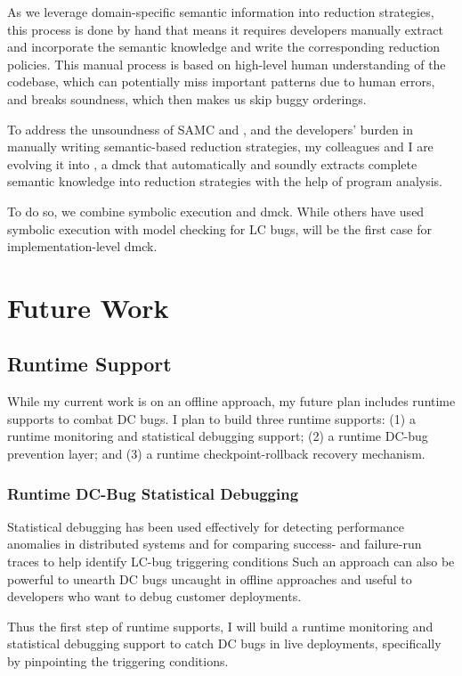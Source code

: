 \documentclass[11pt]{article}
\begin{document}
As we leverage domain-specific semantic information into reduction strategies,
this process is done by hand that means it requires developers manually extract
and incorporate the semantic knowledge and write the corresponding reduction
policies. This manual process is based on high-level human understanding of the
codebase, which can potentially miss important patterns due to human errors, and
breaks soundness, which then makes us skip buggy orderings.

To address the unsoundness of SAMC and \fullcheck, and the developers' burden in
manually writing semantic-based reduction strategies, my colleagues and I are
evolving it into \autocheck, a dmck that automatically and soundly extracts
complete semantic knowledge into reduction strategies with the help of program
analysis.

To do so, we combine symbolic execution and dmck. While others have used
symbolic execution with model checking for LC bugs, \autocheck will be the first
case for implementation-level dmck. 

\section*{Future Work}

\subsection{Runtime Support}

While my current work is on an offline approach, my future plan includes runtime
supports to combat DC bugs. I plan to build three runtime supports: (1) a
runtime monitoring and statistical debugging support; (2) a runtime DC-bug
prevention layer; and (3) a runtime checkpoint-rollback recovery mechanism.

\subsubsection*{Runtime DC-Bug Statistical Debugging}

Statistical debugging has been used effectively for detecting performance
anomalies in distributed systems and for comparing success- and failure-run
traces to help identify LC-bug triggering conditions Such an approach can also
be powerful to unearth DC bugs uncaught in offline approaches and useful to
developers who want to debug customer deployments. 

Thus the first step of runtime supports, I will build a runtime monitoring and
statistical debugging support to catch DC bugs in live deployments, specifically
by pinpointing the triggering conditions.
\end{document}
